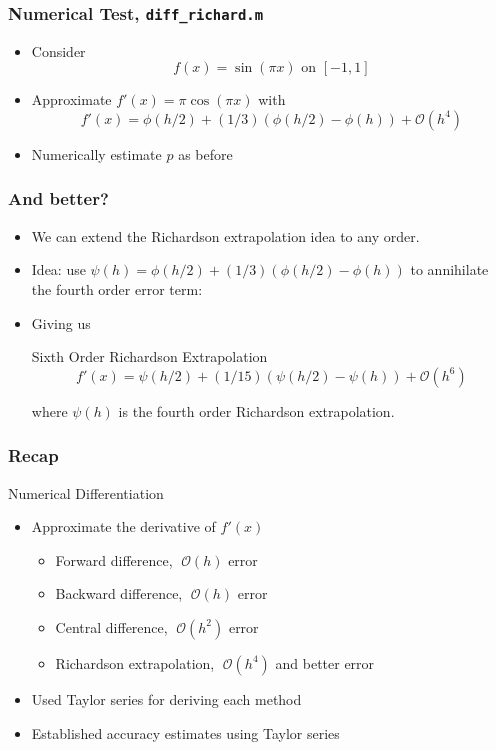 \documentclass[10pt]{beamer}
\newcommand{\mO}{{\mathcal{O}}}
\begin{document}
\begin{frame}
\frametitle{Numerical Test, \texttt{diff_richard.m}}
\begin{itemize}
    \item Consider
    \begin{equation*}
      f(x) = \sin(\pi x)\,\, \text{on}\,\, [-1,1]
    \end{equation*}
    \item Approximate $f'(x) = \pi \cos(\pi x)$ with
    \begin{equation*}
      f'(x) = \phi(h/2) + (1/3) (\phi(h/2) - \phi(h)) + \mO(h^4)
    \end{equation*}
    \item<2-> Numerically estimate $p$ as before
\end{itemize}
\end{frame}
\begin{frame}
\frametitle{And better?}
\begin{itemize}
    \item We can extend the Richardson extrapolation idea to any order.
    \item Idea: use $\psi(h) =  \phi(h/2) + (1/3) (\phi(h/2) - \phi(h))$ to
    annihilate the fourth order error term:
    \item<2-> Giving us 
    \begin{block}{Sixth Order Richardson Extrapolation}
    \begin{equation*}
      f'(x) = \psi(h/2) + (1/15)(\psi(h/2) - \psi(h)) + \mO(h^6)
    \end{equation*}
    \end{block}
    where $\psi(h)$ is the fourth order Richardson extrapolation.
\end{itemize}
\end{frame}
\begin{frame}
\frametitle{Recap}
Numerical Differentiation
\begin{itemize}
  \item Approximate the derivative of $f'(x)$
  \begin{itemize}
        \item Forward difference, $\;\mO(h)$ error
        \item Backward difference, $\;\mO(h)$ error
        \item Central difference, $\;\mO(h^2)$ error 
        \item Richardson extrapolation, $\; \mO(h^4)$ and better error
  \end{itemize}
  \item Used Taylor series for deriving each method
  \item Established accuracy estimates using Taylor series
\end{itemize}
\end{frame}
\end{document}
